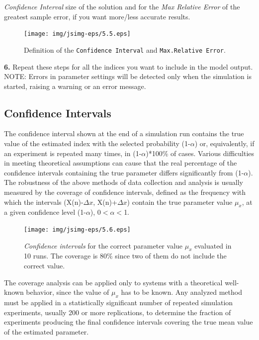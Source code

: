 \emph{Confidence Interval} size of the solution and for the
\emph{Max Relative Error} of the greatest sample error, if you
want more/less accurate results.\\
\begin{figure}[!]
    \begin{center}
        \texttt{[image: img/jsimg-eps/5.5.eps]}
    \end{center}
    \caption{Definition of the \texttt{Confidence Interval} and
    \texttt{Max.Relative Error}.}
    \label{fig:ConfIntMaxerr}
\end{figure}
\textbf{6.} Repeat these steps for all the indices you want to
include in
the model output.\\

NOTE: Errors in parameter settings will be detected only when the
simulation is started, raising a warning or an error message.

\subsection{Confidence Intervals}
\label{conint} The confidence interval shown at the end of a
simulation run contains the true value of the estimated index with
the selected probability (1-$\alpha$) or, equivalently, if an
experiment is repeated many times, in (1-$\alpha$)*100\% of cases.
Various difficulties in meeting theoretical assumptions can cause
that the real percentage of the confidence intervals containing
the true parameter differs significantly from (1-$\alpha$). The
robustness of the above methods of data collection and analysis is
usually measured by the coverage of confidence intervals, defined
as the frequency with which the intervals (X(n)-$\Delta x$,
X(n)+$\Delta x$) contain the true parameter value $\mu_x$, at a
given confidence level (1-$\alpha$), 0$<\alpha<$1.
\begin{figure}[h]
    \begin{center}
        \texttt{[image: img/jsimg-eps/5.6.eps]}
    \end{center}
    \caption{\emph{Confidence intervals} for the correct parameter value $\mu_x$ evaluated
    in 10 runs. The coverage is 80\% since two of them do not include
    the correct value.}
    \label{fig:ConfIntexam}
\end{figure}
The coverage analysis can be applied only to systems with a
theoretical well-known behavior, since the value of $\mu_x$ has to
be known. Any analyzed method must be applied in a statistically
significant number of repeated simulation experiments, usually 200
or more replications, to determine the fraction of experiments
producing the final confidence intervals covering the true mean
value of the estimated parameter.

